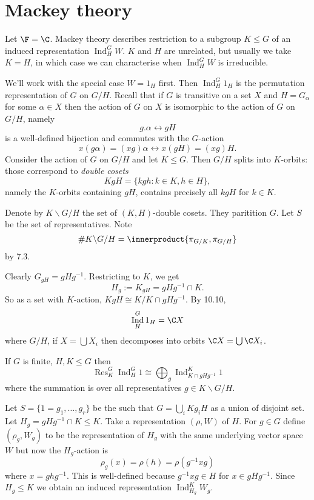 \documentclass[a4paper]{article}
\newcommand*{\ip}{\innerproduct} %
\DeclareMathOperator{\Res}{Res} %
\DeclareMathOperator{\Ind}{Ind} %
\theoremstyle{definition}
\begin{document}
\section{Mackey theory}

Let \(\F = \C\). Mackey theory describes restriction to a subgroup \(K \leq G\) of an induced representation \(\Ind_H^G W\). \(K\) and \(H\) are unrelated, but usually we take \(K = H\), in which case we can characterise when \(\Ind_H^G W\) is irreducible.

We'll work with the special case \(W = 1_H\) first. Then \(\Ind_H^G 1_H\) is the permutation representation of \(G\) on \(G/H\). Recall that if \(G\) is transitive on a set \(X\) and \(H = G_\alpha\) for some \(\alpha \in X\) then the action of \(G\) on \(X\) is isomorphic to the action of \(G\) on \(G/H\), namely
\[
  g . \alpha \leftrightarrow gH
  \tag{*, 12. 1}
\]
is a well-defined bijection and commutes with the \(G\)-action
\[
  x(g\alpha) = (xg) \alpha \leftrightarrow x(gH) = (xg)H.
\]
Consider the action of \(G\) on \(G/H\) and let \(K \leq G\). Then \(G/H\) splits into \(K\)-orbits: those correspond to \emph{double cosets}
\[
  KgH = \{kgh: k \in K, h \in H\},
\]
namely the \(K\)-orbits containing \(gH\), contains precisely all \(kgH\) for \(k \in K\).

\begin{notation}
  Denote by \(K \backslash G/H\) the set of \((K, H)\)-double cosets. They paritition \(G\). Let \(S\) be the set of representatives. Note
  \[
    \# K \backslash G /H = \ip{\pi_{G/K}, \pi_{G/H}}
  \]
  by 7.3.
\end{notation}

  Clearly \(G_{gH} = gHg^{-1}\). Restricting to \(K\), we get
  \[
    H_g := K_{gH} = gHg^{-1} \cap K.
  \]
  So as a set with \(K\)-action, \(KgH \cong K/K \cap gHg^{-1}\). By 10.10,
  \[
    \Ind_H^G 1_H = \C X
  \]
where \(G/H\), if \(X = \bigcup X_i\) then decomposes into orbits \(\C X = \bigcup \C X_i\).

\begin{proposition}
  If \(G\) is finite, \(H, K \leq G\) then
  \[
    \Res_K^G \Ind_H^G 1 \cong \bigoplus_g \Ind_{K \cap gHg^{-1}}^K 1
  \]
  where the summation is over all representatives \(g \in K \backslash G/H\).
\end{proposition}

Let \(S = \{1 = g_1, \dots, g_r\}\) be the such that \(G = \bigcup_i Kg_iH\) as a union of disjoint set. Let \(H_g = gHg^{-1} \cap K \leq K\). Take a representation \((\rho, W)\) of \(H\). For \(g \in G\) define \((\rho_g, W_g)\) to be the representation of \(H_g\) with the same underlying vector space \(W\) but now the \(H_g\)-action is
\[
  \rho_g(x) = \rho(h) = \rho(g^{-1}xg)
\]
where \(x = ghg^{-1}\). This is well-defined because \(g^{-1}xg \in H\) for \(x \in gHg^{-1}\). Since \(H_g \leq K\) we obtain an induced representation \(\Ind_{H_g}^K W_g\).
\end{document}
